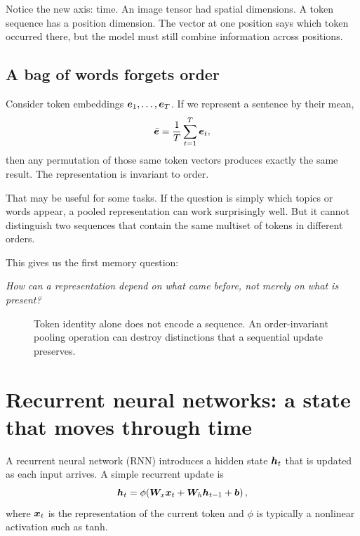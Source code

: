 Notice the new axis: time. An image tensor had spatial dimensions. A token sequence has a position dimension. The vector at one position says which token occurred there, but the model must still combine information across positions.

\subsection{A bag of words forgets order}

Consider token embeddings \(\bm{e}_1,\ldots,\bm{e}_T\). If we represent a sentence by their mean,
\[
  \bar{\bm{e}}=\frac{1}{T}\sum_{t=1}^{T}\bm{e}_t,
\]
then any permutation of those same token vectors produces exactly the same result. The representation is invariant to order.

That may be useful for some tasks. If the question is simply which topics or words appear, a pooled representation can work surprisingly well. But it cannot distinguish two sequences that contain the same multiset of tokens in different orders.

This gives us the first memory question:

\begin{center}
\emph{How can a representation depend on what came before, not merely on what is present?}
\end{center}

\begin{figure}[ht]
  \caption{Token identity alone does not encode a sequence. An order-invariant pooling operation can destroy distinctions that a sequential update preserves.}
  \label{fig:week7-order}
\end{figure}

\section{Recurrent neural networks: a state that moves through time}

A recurrent neural network (RNN) introduces a hidden state \(\bm{h}_t\) that is updated as each input arrives. A simple recurrent update is
\begin{equation}
  \bm{h}_t
  = \phi\!\left(
      \bm{W}_x\bm{x}_t
      + \bm{W}_h\bm{h}_{t-1}
      + \bm{b}
    \right),
  \label{eq:week7-rnn}
\end{equation}
where \(\bm{x}_t\) is the representation of the current token and \(\phi\) is typically a nonlinear activation such as tanh.


